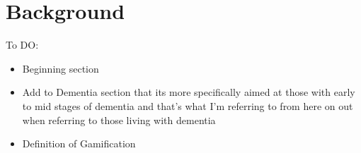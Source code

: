 \documentclass{l4proj}
\begin{document}




    


\chapter{Background}
To DO:
\begin{itemize}
    \item Beginning section
    \item Add to Dementia section that its more specifically aimed at those with early to mid stages of dementia and that’s what I’m referring to from here on out when referring to those living with dementia
    \item Definition of Gamification
\end{itemize}
\end{document}
